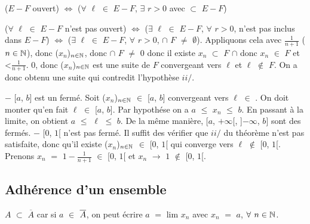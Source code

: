 \documentclass{article}
\begin{document}
($E - F$ ouvert) $\Longleftrightarrow$ ($\forall$ $\ell$ $\in$ $E - F$, $\exists$ $r>0$ avec  $\subset$ $E - F$)




($\forall$ $\ell$ $\in$ $E - F$ n'est pas ouvert) $\Longleftrightarrow$ ($\exists$ $\ell$ $\in$ $E - F$, $\forall$ $r>0$,  n'est pas inclus dans \smallbreak $E - F$) $\Longleftrightarrow$ ($\exists$ $\ell$ $\in$ $E - F$, $\forall$ $r>0$,  $\cap$ $F$ $\neq$ $\emptyset$).
\smallbreak
Appliquons cela avec $\frac{1}{n+1}$ ($n \in \mathbb{N}$), donc ($x_n$)$_{n \in \mathbb{N}}$, donc  $\cap$ $F$ $\neq$ $0$ donc il existe \smallbreak $x_n$ $\subset$ $F$ $\cap$  donc  $x_n$ $\in$ $F$ et  <$\frac{1}{n+1}$.  \tendplusinf \text{ }0, donc ($x_n$)$_{n \in \mathbb{N}}$ est une suite de \smallbreak $F$ convergeant vers $\ell$ et $\ell$ $\notin$ $F$. On a donc obtenu une suite qui contredit l'hypothèse $ii/$.

\ex $-$ [$a$, $b$] est un fermé. Soit ($x_n$)$_{n \in \mathbb{N}}$ $\in$ [$a$, $b$] convergeant vers $\ell$ $\in$ \R. On doit monter qu'en fait $\ell$ $\in$ [$a$, $b$]. Par \smallbreak hypothése on a $a$ $\leqslant$ $x_n$ $\leqslant$ $b$. En passant à la limite, on obtient $a$ $\leqslant$ $\ell$ $\leqslant$ $b$. De la même manière, [$a$, $+\infty$[, \smallbreak ]$-\infty$, $b$] sont des fermés. 
\smallbreak
$-$ [$0$, $1$[ n'est pas fermé. Il suffit des vérifier que $ii/$ du théorème n'est pas satisfaite, donc qu'il existe \smallbreak ($x_n$)$_{n \in \mathbb{N}}$ $\in$ [$0$, $1$[ qui converge vers $\ell$ $\notin$ [$0$, $1$[.
\smallbreak
Prenons $x_n$ $=$ $1 - \frac{1}{n+1}$ $\in$ [$0$, $1$[ et $x_n$ $\longrightarrow$ $1$ $\notin$ [$0$, $1$[.
\subsection{Adhérence d'un ensemble}
\remarque
$A$ $\subset$ $\overline{A}$ car si $a$ $\in$ $\overline{A}$, on peut écrire $a$ $=$ lim $x_n$ avec $x_n$ $=$ $a$, $\forall$ $n \in \mathbb{N}$.
\end{document}
